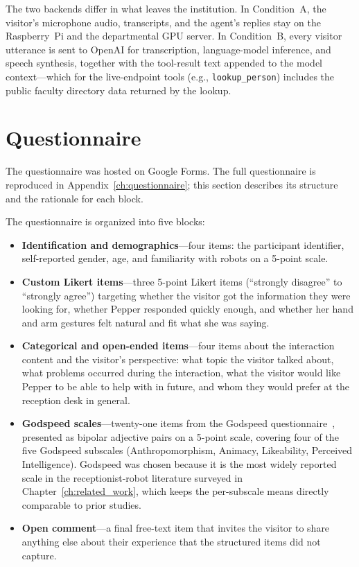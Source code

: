 The two backends differ in what leaves the institution.
In Condition~A, the visitor's microphone audio, transcripts, and the agent's replies stay on the Raspberry~Pi and the departmental GPU server.
In Condition~B, every visitor utterance is sent to OpenAI for transcription, language-model inference, and speech synthesis, together with the tool-result text appended to the model context---which for the live-endpoint tools (e.g., \texttt{lookup\_person}) includes the public faculty directory data returned by the lookup.



\section{Questionnaire}
\label{sec:exp_questionnaire}

The questionnaire was hosted on Google Forms.
The full questionnaire is reproduced in Appendix~\ref{ch:questionnaire}; this section describes its structure and the rationale for each block.

The questionnaire is organized into five blocks:

\begin{itemize}
    \item \textbf{Identification and demographics}---four items: the participant identifier, self-reported gender, age, and familiarity with robots on a 5-point scale.
    \item \textbf{Custom Likert items}---three 5-point Likert items (``strongly disagree'' to ``strongly agree'') targeting whether the visitor got the information they were looking for, whether Pepper responded quickly enough, and whether her hand and arm gestures felt natural and fit what she was saying.
    \item \textbf{Categorical and open-ended items}---four items about the interaction content and the visitor's perspective: what topic the visitor talked about, what problems occurred during the interaction, what the visitor would like Pepper to be able to help with in future, and whom they would prefer at the reception desk in general.
    \item \textbf{Godspeed scales}---twenty-one items from the Godspeed questionnaire~\cite{bartneck2009godspeed}, presented as bipolar adjective pairs on a 5-point scale, covering four of the five Godspeed subscales (Anthropomorphism, Animacy, Likeability, Perceived Intelligence). Godspeed was chosen because it is the most widely reported scale in the receptionist-robot literature surveyed in Chapter~\ref{ch:related_work}, which keeps the per-subscale means directly comparable to prior studies.
    \item \textbf{Open comment}---a final free-text item that invites the visitor to share anything else about their experience that the structured items did not capture.
\end{itemize}

